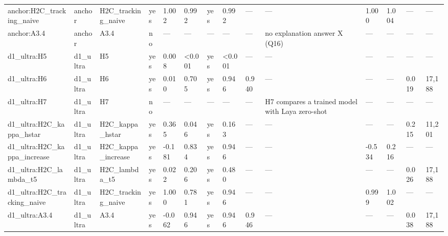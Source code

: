 \begin{tabular}{llllllllllllll}
anchor:H2C\_tracking\_naive & anchor & H2C\_tracking\_naive & yes & 1.002 & 0.992 & yes & 0.992 & — & — & 1.000 & 1.004 & — & — \\
anchor:A3.4 & anchor & A3.4 & no & — & — & — & — & — & no explanation answer X (Q16) & — & — & — & — \\
d1\_ultra:H5 & d1\_ultra & H5 & yes & 0.008 & <0.001 & yes & <0.001 & — & — & — & — & — & — \\
d1\_ultra:H6 & d1\_ultra & H6 & yes & 0.010 & 0.705 & yes & 0.946 & 0.940 & — & — & — & 0.019 & 17,188 \\
d1\_ultra:H7 & d1\_ultra & H7 & no & — & — & — & — & — & H7 compares a trained model with Laya zero-shot & — & — & — & — \\
d1\_ultra:H2C\_kappa\_hstar & d1\_ultra & H2C\_kappa\_hstar & yes & 0.365 & 0.046 & yes & 0.163 & — & — & — & — & 0.215 & 11,201 \\
d1\_ultra:H2C\_kappa\_increase & d1\_ultra & H2C\_kappa\_increase & yes & -0.181 & 0.834 & yes & 0.946 & — & — & -0.534 & 0.216 & — & — \\
d1\_ultra:H2C\_lambda\_t5 & d1\_ultra & H2C\_lambda\_t5 & yes & 0.022 & 0.206 & yes & 0.480 & — & — & — & — & 0.026 & 17,188 \\
d1\_ultra:H2C\_tracking\_naive & d1\_ultra & H2C\_tracking\_naive & yes & 1.000 & 0.781 & yes & 0.946 & — & — & 0.999 & 1.002 & — & — \\
d1\_ultra:A3.4 & d1\_ultra & A3.4 & yes & -0.062 & 0.946 & yes & 0.946 & 0.946 & — & — & — & 0.038 & 17,188 \\
\bottomrule
\end{tabular}
